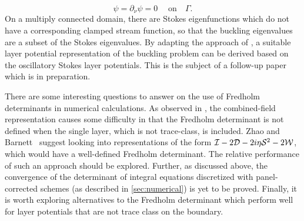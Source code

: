 \begin{equation*}
  \psi = \partial_\nu \psi = 0 \; \quad \textrm{on} \quad \Gamma.
\end{equation*}
On a multiply connected domain, there are
Stokes eigenfunctions which do not have a corresponding
clamped stream function, so that the
buckling eigenvalues are a subset of the Stokes
eigenvalues.
By adapting the approach of \cite{rachh2017integral},
a suitable layer potential representation of the
buckling problem can be derived based on the
oscillatory Stokes layer potentials.
%
This is the subject of a follow-up paper which is in
preparation.

There are some interesting questions to answer
on the use of Fredholm determinants in numerical
calculations.
%
As observed in \cite{zhao2015robust}, the
combined-field representation causes some
difficulty in that the Fredholm determinant
is not defined when the single layer, which
is not trace-class, is included.
%
Zhao and Barnett~\cite{zhao2015robust}
suggest looking into
representations of the form $\mathcal I-2{\mathcal D}
-2i\eta{\mathcal S}^2-2{\mathcal W}$,
which would have a well-defined Fredholm
determinant.
%
The relative performance of
such an approach should be explored.
%
Further, as discussed above, the
convergence of the determinant of
integral equations discretized with
panel-corrected schemes (as described in
\cref{sec:numerical}) is yet to be proved.
%
Finally, it is worth exploring alternatives
to the Fredholm determinant which perform well
for layer potentials that are not trace class
on the boundary.

